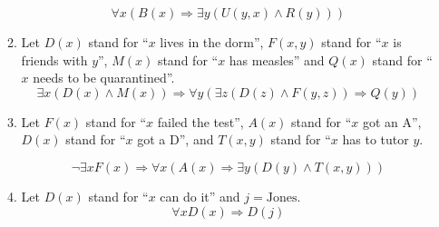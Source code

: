 \documentclass{article}
\begin{document}
\begin{enumerate}
\begin{enumerate}
		\begin{equation*}
			\forall x (B(x) \Rightarrow \exists y(U(y,x) \land R(y)))
		\end{equation*}
  \item Let $D(x)$ stand for ``$x$ lives in the dorm'', $F(x,y)$ stand for ``$x$ is friends with $y$'', $M(x)$ stand for ``$x$ has measles'' and $Q(x)$ stand for ``$x$ needs to be quarantined''.
    \begin{equation*}
      \exists x(D(x) \land M(x)) \Rightarrow \forall y(\exists z (D(z) \land F(y,z)) \Rightarrow Q(y))
    \end{equation*}

  \item Let $F(x)$ stand for ``$x$ failed the test'', $A(x)$ stand for ``$x$ got an A'', $D(x)$ stand for ``$x$ got a D'', and $T(x,y)$ stand for ``$x$ has to tutor $y$.

    \begin{equation*}
      \lnot \exists x F(x) \Rightarrow \forall x (A(x) \Rightarrow \exists y (D(y) \land T(x,y)))
    \end{equation*}
  \item Let $D(x)$ stand for ``$x$ can do it'' and $j = \text{Jones}$.
    \begin{equation*}
      \forall x D(x) \Rightarrow D(j)
    \end{equation*}


\end{enumerate}
\end{enumerate}
\end{document}
